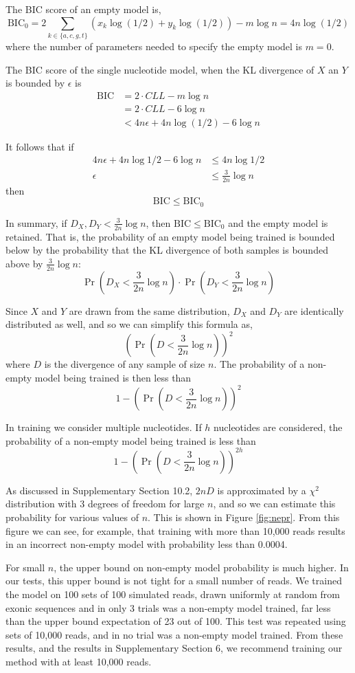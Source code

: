 \documentclass[letterpaper]{article}
\begin{document}
The BIC score of an empty model is,
$$\text{BIC}_0 = 2 \sum_{k \in \{a, c, g, t\}}
\left(
x_k \log(1/2) + y_k \log(1/2) \right) - m
\log n = 4 n \log (1/2) $$
where the number of parameters needed to specify the empty model is $m = 0$.

The BIC score of the single nucleotide model, when the KL divergence of $X$ an
$Y$ is bounded by $\epsilon$ is
\begin{align*}
\text{BIC} &= 2 \cdot CLL - m \log n \\
&= 2 \cdot CLL - 6 \log n \\
&< 4n \epsilon + 4 n \log (1/2) - 6 \log n
\end{align*}

It follows that if
\begin{align*}
4n \epsilon + 4 n \log 1 / 2 - 6 \log n  &\le   4 n \log 1/2 \\
\epsilon &\le \frac{3}{2n} \log n
\end{align*}
then
$$ \text{BIC} \le \text{BIC}_0 $$

In summary, if $D_X, D_Y < \frac{3}{2n} \log n$, then $\text{BIC} \le
\text{BIC}_0$ and the empty model is retained. That is, the probability of an
empty model being trained is bounded below by the probability that the KL
divergence of both samples is bounded above by $\frac{3}{2n} \log n$:
$$ \Pr(D_{X} < \frac{3}{2n} \log n) \cdot 
\Pr(D_{Y} < \frac{3}{2n} \log n) $$

Since $X$ and $Y$ are drawn from the same distribution, $D_{X}$ and $D_{Y}$ are
identically distributed as well, and so we can simplify this formula as,
$$ (\Pr(D < \frac{3}{2n} \log n))^2 $$
where $D$ is the divergence of any sample of size $n$. The probability of a
non-empty model being trained is then less than
$$ 1 - (\Pr(D < \frac{3}{2n} \log n))^2 $$

In training we consider multiple nucleotides. If $h$ nucleotides are considered,
the probability of a non-empty model being trained is less than
$$ 1 - (\Pr(D < \frac{3}{2n} \log n))^{2h} $$

As discussed in Supplementary Section 10.2, $2n D$ is approximated by a $\chi^2$
distribution with 3 degrees of freedom for large $n$, and so we can estimate
this probability for various values of $n$. This is shown in Figure
\ref{fig:nepr}. From this figure we can see, for example, that training with
more than 10,000 reads results in an incorrect non-empty model with probability
less than 0.0004.

For small $n$, the upper bound on non-empty model probability is much higher.
In our tests, this upper bound is not tight for a small number of reads. We
trained the model on 100 sets of 100 simulated reads, drawn uniformly at random
from exonic sequences and in only 3 trials was a non-empty model trained, far
less than the upper bound expectation of 23 out of 100. This test was repeated
using sets of 10,000 reads, and in no trial was a non-empty model trained.  From
these results, and the results in Supplementary Section 6, we recommend training
our method with at least 10,000 reads.
\end{document}

